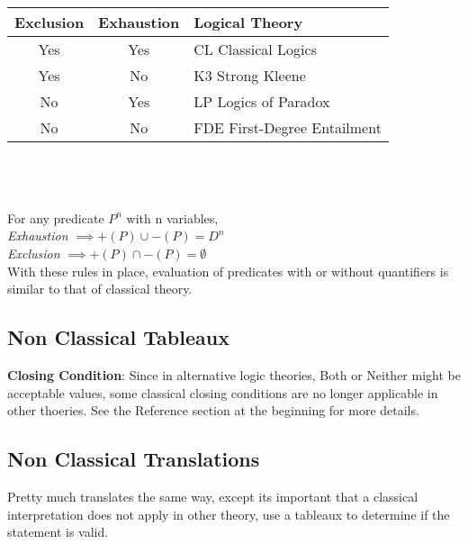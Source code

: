 \documentclass{article}
\begin{document}
\begin{tabular}{c | c| l}
    \hline
    Exclusion & Exhaustion & Logical Theory\\
    \hline
    Yes & Yes & CL Classical Logics\\
    
    Yes & No & K3 Strong Kleene\\
    No & Yes & LP Logics of Paradox \\
    No & No & FDE First-Degree Entailment\\
    \hline
    
\end{tabular}\\  \\ \\

\noindent For any predicate $P^n$ with n variables, \\
\emph{Exhaustion} $\implies +(P) \cup -(P) = D^n$\\
\emph{Exclusion} $\implies +(P) \cap  -(P) = \emptyset$\\
With these rules in place, evaluation of predicates with or without quantifiers is similar to that of classical theory. 


\subsection{Non Classical Tableaux}

\textbf{Closing Condition}: Since in alternative logic theories, Both 
or Neither might be acceptable values, some classical closing conditions are no longer applicable in other thoeries. See the Reference section at the
beginning for more details.

\subsection{Non Classical Translations}
Pretty much translates the same way, except its important that a classical
interpretation does not apply in other theory, use a tableaux to determine if the statement 
is valid.
\end{document}
